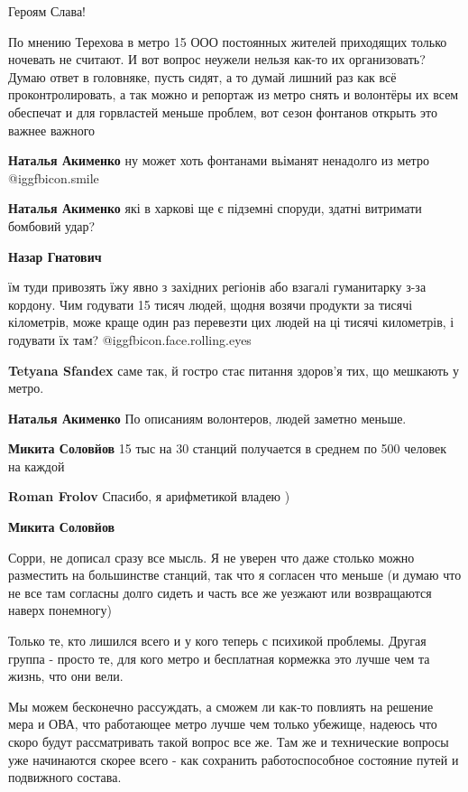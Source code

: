 \begin{itemize}
Героям Слава!


По мнению Терехова в метро 15 ООО постоянных жителей приходящих только ночевать
не считают. И вот вопрос неужели нельзя как-то их организовать? Думаю ответ в
головняке, пусть сидят, а то думай лишний раз как всё проконтролировать, а так
можно и репортаж из метро снять и волонтёры их всем обеспечат и для горвластей
меньше проблем, вот сезон фонтанов открыть это важнее важного

\begin{itemize} %
\textbf{Наталья Акименко} ну может хоть фонтанами вьіманят ненадолго из метро  @igg{fbicon.smile} 

\textbf{Наталья Акименко} які в харкові ще є підземні споруди, здатні витримати бомбовий удар?

\textbf{Назар Гнатович} 

їм туди привозять їжу явно з західних регіонів або взагалі гуманитарку з-за
кордону. Чим годувати 15 тисяч людей, щодня возячи продукти за тисячі
кілометрів, може краще один раз перевезти цих людей на ці тисячі километрів, і
годувати їх там?  @igg{fbicon.face.rolling.eyes} 

\textbf{Tetyana Sfandex} саме так, й гостро стає питання здоров’я тих, що мешкають у метро.

\textbf{Наталья Акименко} По описаниям волонтеров, людей заметно меньше.

\textbf{Микита Соловйов} 15 тыс на 30 станций получается в среднем по 500 человек на каждой

\textbf{Roman Frolov} Спасибо, я арифметикой владею )

\textbf{Микита Соловйов} 

Сорри, не дописал сразу все мысль. Я не уверен что даже столько можно
разместить на большинстве станций, так что я согласен что меньше (и думаю что
не все там согласны долго сидеть и часть все же уезжают или возвращаются наверх
понемногу)

Только те, кто лишился всего и у кого теперь с психикой проблемы. Другая группа
- просто те, для кого метро и бесплатная кормежка это лучше чем та жизнь, что
они вели.

Мы можем бесконечно рассуждать, а сможем ли как-то повлиять на решение мера и
ОВА, что работающее метро лучше чем только убежище, надеюсь что скоро будут
рассматривать такой вопрос все же. Там же и технические вопросы уже начинаются
скорее всего - как сохранить работоспособное состояние путей и подвижного
состава.


\end{itemize}
\end{itemize}
